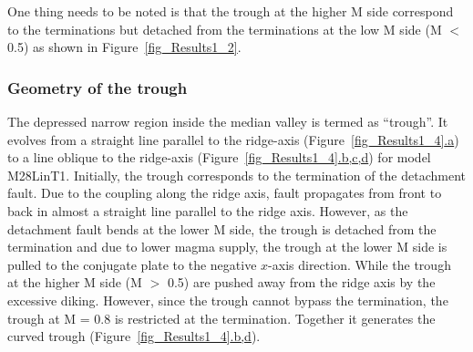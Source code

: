 One thing needs to be noted is that the trough at the higher M side correspond to the terminations but detached from the terminations at the low M side (M $<$ 0.5) as shown in Figure~\hyperref[fig_Results1_2]{\ref{fig_Results1_2}}.

\subsubsection{Geometry of the trough}

The depressed narrow region inside the median valley is termed as ``trough''. It evolves from a straight line parallel to the ridge-axis (Figure~\hyperref[fig_Results1_4]{\ref{fig_Results1_4}.a}) to a line oblique to the ridge-axis (Figure~\hyperref[fig_Results1_4]{\ref{fig_Results1_4}.b,c,d}) for model M28LinT1. Initially, the trough corresponds to the termination of the detachment fault. Due to the coupling along the ridge axis, fault propagates from front to back in almost a straight line parallel to the ridge axis. However, as the detachment fault bends at the lower M side, the trough is detached from the termination and due to lower magma supply, the trough at the lower M side is pulled to the conjugate plate to the negative $x$-axis direction. While the trough at the higher M side (M $>$ 0.5) are pushed away from the ridge axis by the excessive diking. However, since the trough cannot bypass the termination, the trough at M = 0.8 is restricted at the termination. Together it generates the curved trough (Figure~\hyperref[fig_Results1_4]{\ref{fig_Results1_4}.b,d}). 


